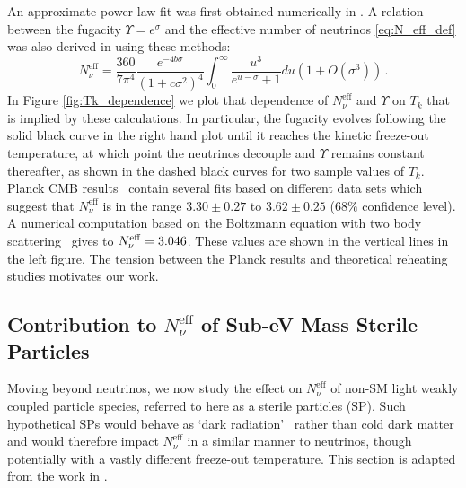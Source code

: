 An approximate power law fit was first obtained numerically in \cite{Birrell:2013gpa}. A relation between   the fugacity $\Upsilon=e^\sigma$ and the effective number of neutrinos \eqref{eq:N_eff_def} was also derived in \cite{Birrell:2012gg} using these methods:
\begin{equation}\label{N_nu_approx}
N^{\mathrm{eff}}_\nu=\frac{360}{7\pi^4}\frac{e^{-4b\sigma}}{(1+c\sigma^2)^4}\int_0^\infty \frac{u^3}{e^{u-\sigma}+1}du\left(1+O(\sigma^3)\right)\,.
\end{equation}
 In Figure \ref{fig:Tk_dependence} we plot that dependence of $N^{\mathrm{eff}}_\nu$ and $\Upsilon$  on $T_k$ that is implied by these calculations.  In particular, the fugacity evolves following the solid black curve in the right hand plot until it reaches the kinetic freeze-out temperature, at which point the neutrinos decouple and $\Upsilon$ remains constant thereafter, as shown in the dashed black curves for two sample values of $T_k$. Planck CMB results~\cite{Planck:2013pxb}  contain several fits based on different data sets which suggest that $N^{\mathrm{eff}}_\nu$ is in the range $3.30\pm 0.27$ to $3.62\pm0.25$ ($68\%$ confidence level). A numerical computation based on the Boltzmann equation with two body scattering~\cite{Mangano:2005cc} gives to $N_{\nu}^{\rm eff}=3.046$. These values are shown in the vertical lines in the left figure. The tension between the Planck results and theoretical reheating studies motivates our work.





\subsection{Contribution to $N^{\text{eff}}_{\nu}$ of  Sub-eV  Mass Sterile Particles}\label{sec:Neff_QGP}

Moving beyond neutrinos, we now study the effect on $N_\nu^{\text{eff}}$ of non-SM light weakly coupled  particle species, referred to here as a sterile particles (SP). Such hypothetical SPs would behave as `dark radiation'~\cite{Steigman:2013yua} rather than cold dark matter and would therefore impact $N_\nu^{\text{eff}}$ in a similar manner to neutrinos, though potentially with a vastly different freeze-out temperature.  This section is adapted from the work in \cite{Birrell:2014cja}.


